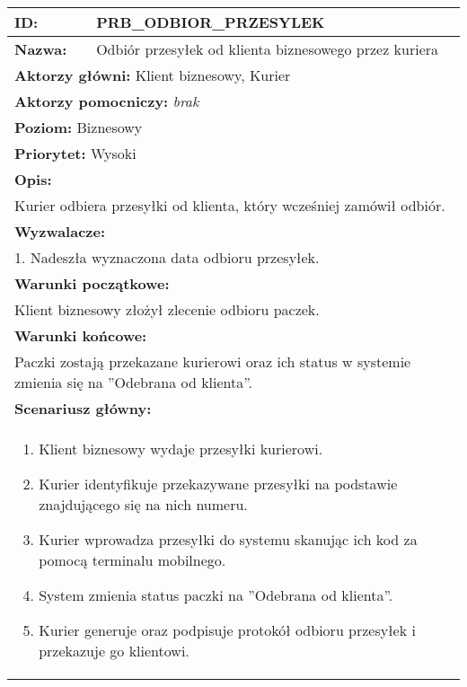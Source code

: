 \begin{center}
\begin{longtable}[h]{|p{1.6cm}|p{13.5cm}|}
\hline
\textbf{ID:} & PRB\_ODBIOR\_PRZESYLEK \\ \hline
\textbf{Nazwa:} & Odbiór przesyłek od klienta biznesowego przez kuriera \\ \hline
\multicolumn{2}{|p{15.1cm}|}{\textbf{Aktorzy główni:}  Klient biznesowy, Kurier} \\
\multicolumn{2}{|p{15.1cm}|}{\textbf{Aktorzy pomocniczy:} \textit{brak}} \\
\multicolumn{2}{|p{15.1cm}|}{\textbf{Poziom:}  Biznesowy} \\
\multicolumn{2}{|p{15.1cm}|}{\textbf{Priorytet:}  Wysoki} \\
\hline
\multicolumn{2}{|p{15.1cm}|}{\textbf{Opis:}} \\
\multicolumn{2}{|p{15.1cm}|}{Kurier odbiera przesyłki od klienta, który wcześniej zamówił odbiór.
} \\ \hline
\multicolumn{2}{|p{15.1cm}|}{\textbf{Wyzwalacze:}} \\
\multicolumn{2}{|p{15.1cm}|}{1. Nadeszła wyznaczona data odbioru przesyłek.
} \\ \hline
\multicolumn{2}{|p{15.1cm}|}{\textbf{Warunki początkowe:}} \\
\multicolumn{2}{|p{15.1cm}|}{Klient biznesowy złożył zlecenie odbioru paczek.
} \\ \hline
\multicolumn{2}{|p{15.1cm}|}{\textbf{Warunki końcowe:}} \\
\multicolumn{2}{|p{15.1cm}|}{
Paczki zostają przekazane kurierowi oraz ich status w systemie zmienia się na ''Odebrana od klienta''.
} \\ \hline
\multicolumn{2}{|p{15.1cm}|}{\textbf{Scenariusz główny:}} \\
\multicolumn{2}{|p{15.1cm}|}{
\begin{enumerate}
\item Klient biznesowy wydaje przesyłki kurierowi. \label{sce:wyd_pacz}
\item Kurier identyfikuje przekazywane przesyłki na podstawie znajdującego się na nich numeru.
\item Kurier wprowadza przesyłki do systemu skanując ich kod za pomocą terminalu mobilnego.
\item System zmienia status paczki na ''Odebrana od klienta''.
\item Kurier generuje oraz podpisuje protokół odbioru przesyłek i przekazuje go klientowi.
\end{enumerate}
}
\end{longtable}
\end{center}
